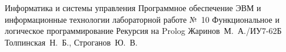 \documentclass[a4paper,oneside,14pt]{extarticle}
\begin{document}
\makereporttitle
{Информатика и системы управления} %
{Программное обеспечение ЭВМ и информационные технологии} %
{лабораторной работе №~10} %
{Функциональное и логическое программирование} %
{Рекурсия на Prolog} %
{} %
{Жаринов~М.~А./ИУ7-62Б} %
{Толпинская~Н.~Б., Строганов~Ю.~В.} %

\setcounter{page}{2}





\end{document}
